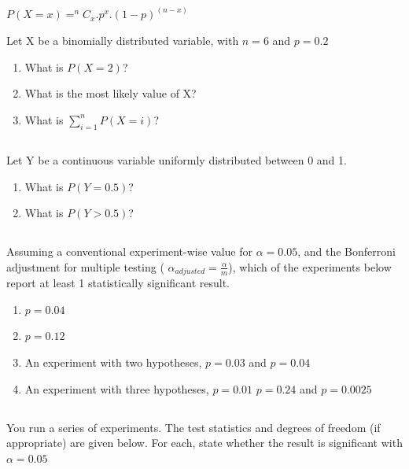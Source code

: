 \documentclass[twocolumn]{article}
\begin{document}
\begin{center}
    $P(X = x) = ^nC_x.p^x.(1-p)^{(n-x)}$
\end{center}

Let X be a binomially distributed variable, with $n=6$ and $p=0.2$

\begin{enumerate}
    \item What is $P(X=2)$?
    \item What is the most likely value of X?
    \item What is $\sum_{i=1}^n P(X = i)$?
\end{enumerate}

\subsection{}

Let Y be a continuous variable uniformly distributed between 0 and 1.

\begin{enumerate}
    \item What is $P(Y = 0.5)$?
    \item What is $P(Y > 0.5)$?
\end{enumerate}

\subsection{}

Assuming a conventional experiment-wise value for $ \alpha = 0.05 $, and the Bonferroni adjustment for multiple testing ( $\alpha_{adjusted} = \frac{\alpha}{m}$), which of the experiments below report at least 1 statistically significant result.

\begin{enumerate}
    \item $ p = 0.04 $
    \item $ p = 0.12 $
    \item An experiment with two hypotheses, $p = 0.03$ and $p=0.04 $
    \item An experiment with three hypotheses, $p = 0.01$ $p=0.24$ and $p=0.0025 $ 
\end{enumerate}

\subsection{}

You run a series of experiments. The test statistics and degrees of freedom (if appropriate) are given below. For each, state whether the result is significant with $\alpha = 0.05$
\end{document}

